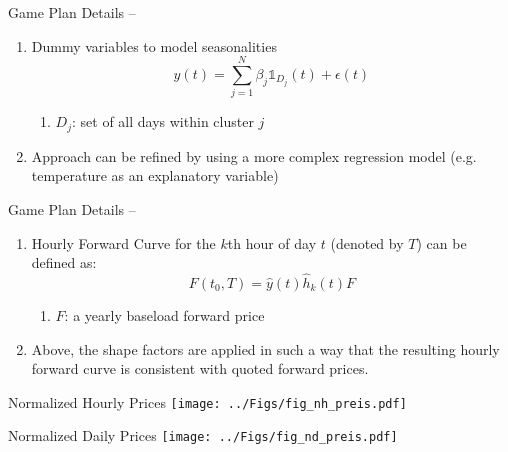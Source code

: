 \documentclass{beamer}
\begin{document}
\begin{frame}{Game Plan Details -- \cite{BurgerGraeberSchindlmayr-2014}}
    \begin{enumerate}[label=$\bullet$, itemsep=0.1cm]
        \item Dummy variables to model seasonalities
              \[
                  y(t)
                  = \sum_{j = 1}^N \beta_j \mathds{1}_{D_j}(t) + \epsilon(t)
              \]
              \begin{enumerate}[label=--]
                  \item $D_j$: set of all days within cluster $j$
              \end{enumerate}

        \item Approach can be refined by using a more complex regression model (e.g. temperature as an explanatory variable)
    \end{enumerate}
\end{frame}


\begin{frame}{Game Plan Details -- \cite{BurgerGraeberSchindlmayr-2014}}
    \begin{enumerate}[label=--]
        \item Hourly Forward Curve for the $k$th hour of day $t$ (denoted by $T$) can be defined as:
              \[
                  F(t_0, T) = \hat y(t) \hat h_k(t) F
              \]
              \begin{enumerate}[label=$\bullet$]
                  \item $F$: a yearly baseload forward price
              \end{enumerate}

        \item Above, the shape factors are applied in such a way that the resulting hourly forward curve is consistent with quoted forward prices.
    \end{enumerate}
\end{frame}


\begin{frame}{Normalized Hourly Prices}
    \texttt{[image: ../Figs/fig\_nh\_preis.pdf]}
\end{frame}


\begin{frame}{Normalized Daily Prices}
    \texttt{[image: ../Figs/fig\_nd\_preis.pdf]}
\end{frame}


\end{document}
